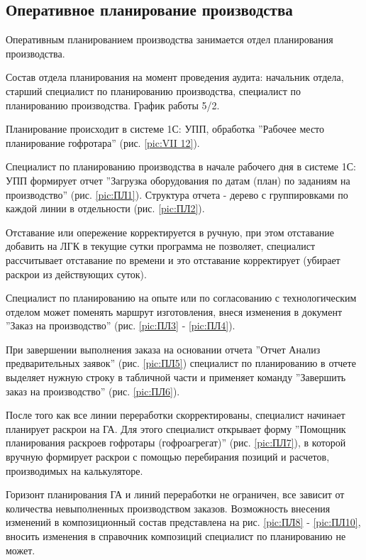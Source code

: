 \subsection{Оперативное планирование производства}
\label{bp:OperPlan}

Оперативным планированием производства занимается отдел планирования производства. 

Состав отдела планирования на момент проведения аудита: начальник отдела, старший специалист по планированию производства, специалист по планированию производства. График работы 5/2.

Планирование происходит в системе 1С: УПП, обработка ''Рабочее место планирование гофротара'' (рис. \ref{pic:VII 12}).


Специалист по планированию производства в начале рабочего дня в системе 1С: УПП формирует отчет ''Загрузка оборудования по датам (план) по заданиям на производство'' (рис. \ref{pic:ПЛ1}). Структура отчета - дерево с группировками по каждой линии в отдельности (рис. \ref{pic:ПЛ2}). 

Отставание или опережение корректируется в ручную, при этом отставание добавить на ЛГК в текущие сутки программа не позволяет, специалист рассчитывает отставание по времени и это отставание корректирует (убирает раскрои из действующих суток).

Специалист по планированию на опыте или по согласованию с технологическим отделом может поменять маршрут изготовления, внеся изменения в документ ''Заказ на производство'' (рис. \ref{pic:ПЛ3} - \ref{pic:ПЛ4}).

При завершении выполнения заказа на основании отчета ''Отчет Анализ предварительных заявок'' (рис. \ref{pic:ПЛ5}) специалист по планированию в отчете выделяет нужную строку в табличной части и применяет команду ''Завершить заказ на производство'' (рис. \ref{pic:ПЛ6}). 

После того как все линии переработки скорректированы, специалист начинает планирует раскрои на ГА.
Для этого специалист открывает форму ''Помощник планирования раскроев гофротары (гофроагрегат)'' (рис. \ref{pic:ПЛ7}), в которой вручную формирует раскрои с помощью перебирания позиций и расчетов, производимых на калькуляторе. 

Горизонт планирования ГА и линий переработки не ограничен, все зависит от количества невыполненных производством заказов. Возможность внесения изменений в композиционный состав представлена на рис. \ref{pic:ПЛ8} - \ref{pic:ПЛ10}, вносить изменения в справочник композиций специалист по планированию не может.

